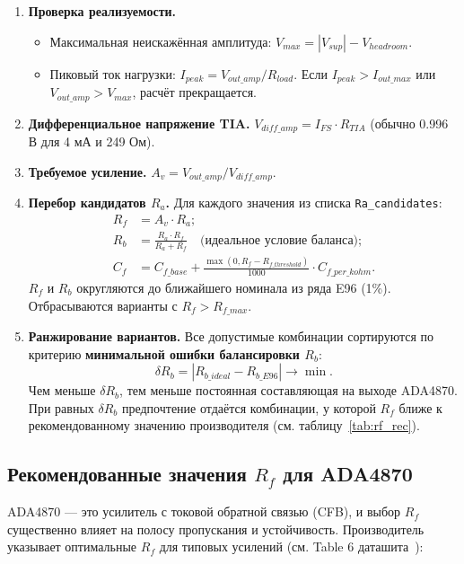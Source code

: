 \documentclass[a4paper, 12pt]{article}
\begin{document}
\begin{enumerate}
  \item \textbf{Проверка реализуемости.}
    \begin{itemize}
      \item Максимальная неискажённая амплитуда: \(V_{max} = |V_{sup}| - V_{headroom}\).
      \item Пиковый ток нагрузки: \(I_{peak} = V_{out\_amp}/R_{load}\). Если \(I_{peak} > I_{out\_max}\) или \(V_{out\_amp} > V_{max}\), расчёт прекращается.
    \end{itemize}
  \item \textbf{Дифференциальное напряжение TIA.}
    \(V_{diff\_amp} = I_{FS} \cdot R_{TIA}\) (обычно 0.996 В для 4 мА и 249 Ом).
  \item \textbf{Требуемое усиление.}
    \(A_v = V_{out\_amp} / V_{diff\_amp}\).
  \item \textbf{Перебор кандидатов \(R_a\).}
    Для каждого значения из списка \texttt{Ra\_candidates}:
    \begin{align*}
      R_f &= A_v \cdot R_a;\\
      R_b &= \frac{R_a \cdot R_f}{R_a + R_f}\quad \text{(идеальное условие баланса)};\\
      C_f &= C_{f\_base} + \frac{\max(0, R_f - R_{f\_threshold})}{1000} \cdot C_{f\_per\_kohm}.
    \end{align*}
    \(R_f\) и \(R_b\) округляются до ближайшего номинала из ряда E96 (1\%).
    Отбрасываются варианты с \(R_f > R_{f\_max}\).
  \item \textbf{Ранжирование вариантов.}
    Все допустимые комбинации сортируются по критерию \textbf{минимальной ошибки балансировки \(R_b\)}:
    \[
      \delta R_b = |R_{b\_ideal} - R_{b\_E96}| \to \min.
    \]
    Чем меньше \(\delta R_b\), тем меньше постоянная составляющая на выходе ADA4870. При равных \(\delta R_b\) предпочтение отдаётся комбинации, у которой \(R_f\) ближе к рекомендованному значению производителя (см. таблицу~\ref{tab:rf_rec}).
\end{enumerate}

\subsection{Рекомендованные значения \(R_f\) для ADA4870}
\label{sec:rf_recommendation}

ADA4870 — это усилитель с токовой обратной связью (CFB), и выбор \(R_f\) существенно влияет на полосу пропускания и устойчивость. Производитель указывает оптимальные \(R_f\) для типовых усилений (см. Table 6 даташита~\cite{ADA4870_ds}):
\end{document}
